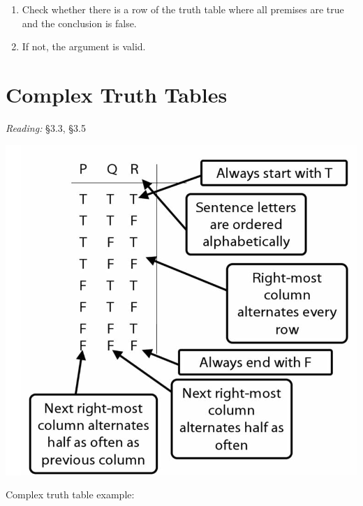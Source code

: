 \documentclass[12pt]{extarticle}
\begin{document}
\begin{multicols*}{3}
\begin{minipage}{\columnwidth}
\begin{enumerate}
\item Check whether there is a row of the truth table where all premises are true and the conclusion is false.
 
\item If not, the argument is valid.
 
\end{enumerate}
 
\end{minipage}
 
 
 
\section{Complex Truth Tables}
 
\emph{Reading:} §3.3, §3.5
 
\begin{center}
\includegraphics[scale=0.3]{img/how_to_write_truth_tables.png}
\end{center}
\begin{minipage}{\columnwidth}
 
Complex truth table example:
 

\end{minipage}
\end{multicols*}
\end{document}
